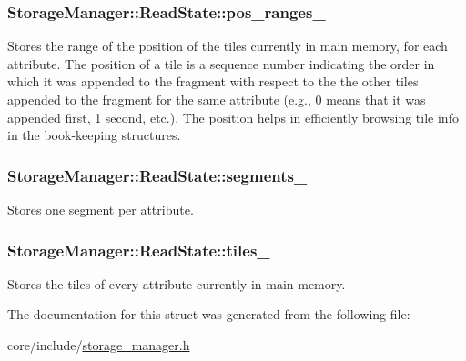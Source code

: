 \subsubsection[{pos\+\_\+ranges\+\_\+}]{ Storage\+Manager\+::\+Read\+State\+::pos\+\_\+ranges\+\_\+}\label{structStorageManager_1_1ReadState_a0705f10a907f1d4b7b1f510ea3db3f06}
Stores the range of the position of the tiles currently in main memory, for each attribute. The position of a tile is a sequence number indicating the order in which it was appended to the fragment with respect to the the other tiles appended to the fragment for the same attribute (e.\+g., 0 means that it was appended first, 1 second, etc.). The position helps in efficiently browsing tile info in the book-\/keeping structures. \hypertarget{structStorageManager_1_1ReadState_a081db3c4d4e63810c2419e7fd731d0ef}{}
\subsubsection[{segments\+\_\+}]{ Storage\+Manager\+::\+Read\+State\+::segments\+\_\+}\label{structStorageManager_1_1ReadState_a081db3c4d4e63810c2419e7fd731d0ef}
Stores one segment per attribute. \hypertarget{structStorageManager_1_1ReadState_acf1541e41609d80545b309567267b519}{}
\subsubsection[{tiles\+\_\+}]{ Storage\+Manager\+::\+Read\+State\+::tiles\+\_\+}\label{structStorageManager_1_1ReadState_acf1541e41609d80545b309567267b519}
Stores the tiles of every attribute currently in main memory. 

The documentation for this struct was generated from the following file\+:\begin{DoxyCompactItemize}
\item 
core/include/\hyperlink{storage__manager_8h}{storage\+\_\+manager.\+h}\end{DoxyCompactItemize}
